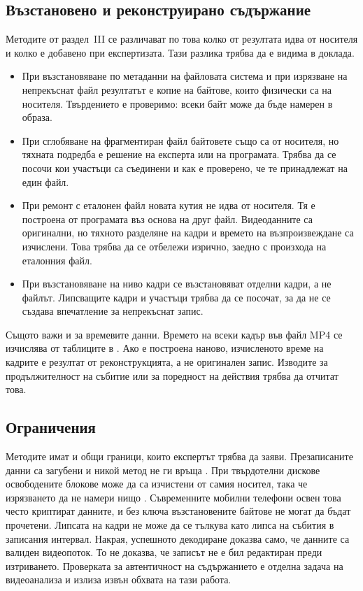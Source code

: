 \subsection{Възстановено и реконструирано съдържание}

Методите от раздел~III се различават по това колко от резултата идва от носителя и
колко е добавено при експертизата. Тази разлика трябва да е видима в доклада.

\begin{itemize}[leftmargin=2cm]
  \item При възстановяване по метаданни на файловата система и при изрязване на
        непрекъснат файл резултатът е копие на байтове, които физически са на носителя.
        Твърдението е проверимо: всеки байт може да бъде намерен в образа.
  \item При сглобяване на фрагментиран файл байтовете също са от носителя, но
        тяхната подредба е решение на експерта или на програмата. Трябва да се посочи кои
        участъци са съединени и как е проверено, че те принадлежат на един файл.
  \item При ремонт с еталонен файл новата кутия  не идва от носителя. Тя е
        построена от програмата въз основа на друг файл. Видеоданните са оригинални, но
        тяхното разделяне на кадри и времето на възпроизвеждане са изчислени. Това трябва
        да се отбележи изрично, заедно с произхода на еталонния файл.
  \item При възстановяване на ниво кадри се възстановяват отделни кадри, а не файлът.
        Липсващите кадри и участъци трябва да се посочат, за да не се създава впечатление
        за непрекъснат запис.
\end{itemize}

Същото важи и за времевите данни. Времето на всеки кадър във файл MP4 се изчислява от
таблиците в  \cite{iso14496_12}. Ако  е построена наново,
изчисленото време на кадрите е резултат от реконструкцията, а не оригинален запис.
Изводите за продължителност на събитие или за поредност на действия трябва да отчитат
това.

\subsection{Ограничения}

Методите имат и общи граници, които експертът трябва да заяви. Презаписаните данни са
загубени и никой метод не ги връща \cite{na2014}. При твърдотелни дискове освободените
блокове може да са изчистени от самия носител, така че изрязването да не намери нищо
\cite{bell2010}. Съвременните мобилни телефони освен това често криптират данните, и
без ключа възстановените байтове не могат да бъдат прочетени. Липсата на кадри не може да се тълкува
като липса на събития в записания интервал. Накрая, успешното декодиране доказва само,
че данните са валиден видеопоток. То не доказва, че записът не е бил редактиран преди
изтриването. Проверката за автентичност на съдържанието е отделна задача на
видеоанализа и излиза извън обхвата на тази работа.
